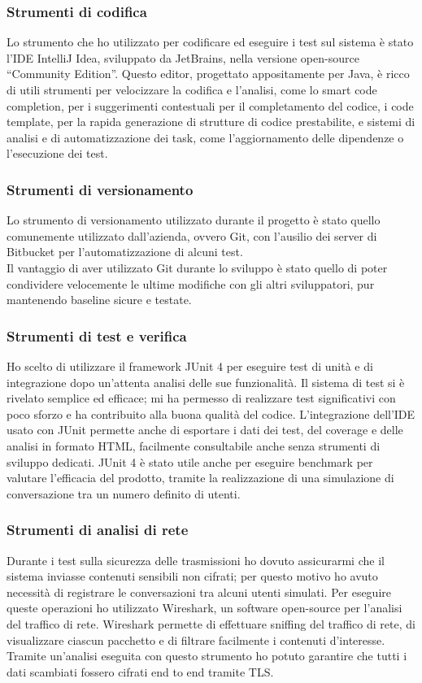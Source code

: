		\subsubsection{Strumenti di codifica}
		Lo strumento che ho utilizzato per codificare ed eseguire i test sul sistema è stato l'IDE IntelliJ Idea, sviluppato da JetBrains, nella versione open-source ``Community Edition''. Questo editor, progettato appositamente per Java, è ricco di utili strumenti per velocizzare la codifica e l'analisi, come lo smart code completion, per i suggerimenti contestuali per il completamento del codice, i code template, per la rapida generazione di strutture di codice prestabilite, e sistemi di analisi e di automatizzazione dei task, come l'aggiornamento delle dipendenze o l'esecuzione dei test.

		\subsubsection{Strumenti di versionamento}
		Lo strumento di versionamento utilizzato durante il progetto è stato quello comunemente utilizzato dall'azienda, ovvero Git, con l'ausilio dei server di Bitbucket per l'automatizzazione di alcuni test.
		\\
		Il vantaggio di aver utilizzato Git durante lo sviluppo è stato quello di poter condividere velocemente le ultime modifiche con gli altri sviluppatori, pur mantenendo baseline sicure e testate.
		
		\subsubsection{Strumenti di test e verifica}
		Ho scelto di utilizzare il framework JUnit 4 per eseguire test di unità e di integrazione dopo un'attenta analisi delle sue funzionalità. Il sistema di test si è rivelato semplice ed efficace; mi ha permesso di realizzare test significativi con poco sforzo e ha contribuito alla buona qualità del codice. L'integrazione dell'IDE usato con JUnit permette anche di esportare i dati dei test, del coverage e delle analisi in formato \gls{HTML}, facilmente consultabile anche senza strumenti di sviluppo dedicati. JUnit 4 è stato utile anche per eseguire benchmark per valutare l'efficacia del prodotto, tramite la realizzazione di una simulazione di conversazione tra un numero definito di utenti.
		
		\subsubsection{Strumenti di analisi di rete}
		Durante i test sulla sicurezza delle trasmissioni ho dovuto assicurarmi che il sistema inviasse contenuti sensibili non cifrati; per questo motivo ho avuto necessità di registrare le conversazioni tra alcuni utenti simulati. Per eseguire queste operazioni ho utilizzato Wireshark, un software open-source per l'analisi del traffico di rete. Wireshark permette di effettuare sniffing del traffico di rete, di visualizzare ciascun pacchetto e di filtrare facilmente i contenuti d'interesse. Tramite un'analisi eseguita con questo strumento ho potuto garantire che tutti i dati scambiati fossero cifrati end to end tramite \gls{TLS}.\@
		

